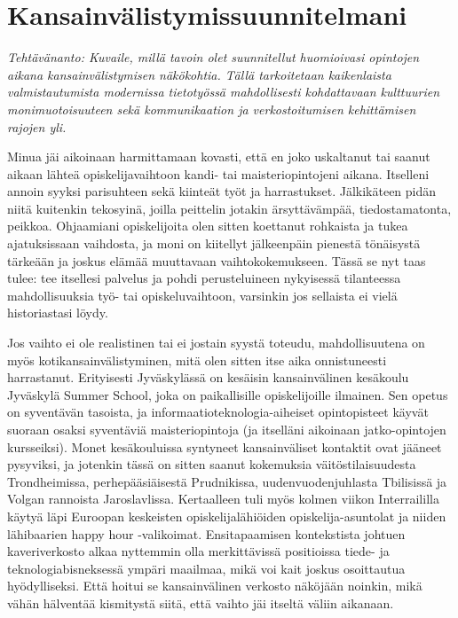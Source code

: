 \documentclass[utf8]{gradu3}
\begin{document}
\section{Kansainvälistymissuunnitelmani}

\textit{Tehtävänanto: Kuvaile, millä tavoin olet suunnitellut huomioivasi
  opintojen aikana kansainvälistymisen näkökohtia. Tällä tarkoitetaan
  kaikenlaista valmistautumista modernissa tietotyössä mahdollisesti
  kohdattavaan kulttuurien monimuotoisuuteen sekä kommunikaation ja
  verkostoitumisen kehittämisen rajojen yli.}

Minua jäi aikoinaan harmittamaan kovasti, että en joko uskaltanut tai saanut
aikaan lähteä opiskelijavaihtoon kandi- tai maisteriopintojeni aikana. Itselleni
annoin syyksi parisuhteen sekä kiinteät työt ja harrastukset. Jälkikäteen pidän
niitä kuitenkin tekosyinä, joilla peittelin jotakin ärsyttävämpää,
tiedostamatonta, peikkoa. Ohjaamiani opiskelijoita olen sitten koettanut
rohkaista ja tukea ajatuksissaan vaihdosta, ja moni on kiitellyt jälkeenpäin
pienestä tönäisystä tärkeään ja joskus elämää muuttavaan vaihtokokemukseen.
Tässä se nyt taas tulee: tee itsellesi palvelus ja pohdi perusteluineen
nykyisessä tilanteessa mahdollisuuksia työ- tai opiskeluvaihtoon, varsinkin jos
sellaista ei vielä historiastasi löydy.

Jos vaihto ei ole realistinen tai ei jostain syystä toteudu, mahdollisuutena on
myös kotikansainvälistyminen, mitä olen sitten itse aika onnistuneesti
harrastanut. Erityisesti Jyväskylässä on kesäisin kansainvälinen kesäkoulu
Jyväskylä Summer School, joka on paikallisille opiskelijoille ilmainen. Sen
opetus on syventävän tasoista, ja informaatioteknologia-aiheiset opintopisteet
käyvät suoraan osaksi syventäviä maisteriopintoja (ja itselläni aikoinaan
jatko-opintojen kursseiksi).
%
Monet kesäkouluissa syntyneet kansainväliset kontaktit ovat jääneet pysyviksi,
ja jotenkin tässä on sitten saanut kokemuksia väitöstilaisuudesta Trondheimissa,
perhepääsiäisestä Prudnikissa, uudenvuodenjuhlasta Tbilisissä ja Volgan
rannoista Jaroslavlissa. Kertaalleen tuli myös kolmen viikon Interraililla
käytyä läpi Euroopan keskeisten opiskelijalähiöiden opiskelija-asuntolat ja
niiden lähibaarien happy hour -valikoimat.
%
Ensitapaamisen kontekstista johtuen kaveriverkosto alkaa nyttemmin olla
merkittävissä positioissa tiede- ja teknologiabisneksessä ympäri maailmaa, mikä
voi kait joskus osoittautua hyödylliseksi. Että hoitui se kansainvälinen
verkosto näköjään noinkin, mikä vähän hälventää kismitystä siitä, että vaihto
jäi itseltä väliin aikanaan.
\end{document}

